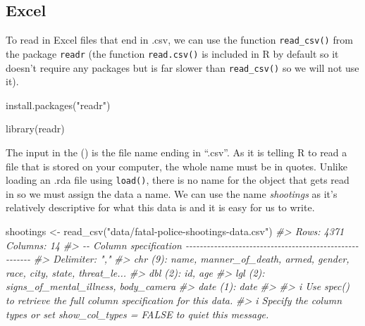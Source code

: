 \documentclass[
]{krantz}
\makeatletter
\newenvironment{Shaded}{\begin{snugshade}}{\end{snugshade}}
\newcommand{\CommentTok}[1]{\textcolor[rgb]{0.37,0.37,0.37}{\textit{#1}}}
\newcommand{\FunctionTok}[1]{\textcolor[rgb]{0,0,0}{#1}}
\newcommand{\NormalTok}[1]{#1}
\newcommand{\OtherTok}[1]{\textcolor[rgb]{0.37,0.37,0.37}{#1}}
\newcommand{\StringTok}[1]{\textcolor[rgb]{0.5,0.5,0.5}{#1}}
\newenvironment{kframe}{%
\medskip{}
\setlength{\fboxsep}{.8em}
 \def\at@end@of@kframe{}%
 \ifinner\ifhmode%
  \def\at@end@of@kframe{\end{minipage}}%
  \begin{minipage}{\columnwidth}%
 \fi\fi%
 \def\FrameCommand##1{\hskip\@totalleftmargin \hskip-\fboxsep
 \colorbox{shadecolor}{##1}\hskip-\fboxsep
     \hskip-\linewidth \hskip-\@totalleftmargin \hskip\columnwidth}%
 \MakeFramed {\advance\hsize-\width
   \@totalleftmargin\z@ \linewidth\hsize
   \@setminipage}}%
 {\par\unskip\endMakeFramed%
 \at@end@of@kframe}
\renewenvironment{Shaded}{\begin{kframe}}{\end{kframe}}
\makeatother
\begin{document}
\hypertarget{excel}{%
\subsection{Excel}\label{excel}}

To read in Excel files that end in .csv, we can use the function \texttt{read\_csv()} from the package \texttt{readr} (the function \texttt{read.csv()} is included in R by default so it doesn't require any packages but is far slower than \texttt{read\_csv()} so we will not use it).

\begin{Shaded}
\begin{Highlighting}[]
\FunctionTok{install.packages}\NormalTok{(}\StringTok{"readr"}\NormalTok{)}
\end{Highlighting}
\end{Shaded}

\begin{Shaded}
\begin{Highlighting}[]
\FunctionTok{library}\NormalTok{(readr)}
\end{Highlighting}
\end{Shaded}

The input in the () is the file name ending in ``.csv''. As it is telling R to read a file that is stored on your computer, the whole name must be in quotes. Unlike loading an .rda file using \texttt{load()}, there is no name for the object that gets read in so we must assign the data a name. We can use the name \emph{shootings} as it's relatively descriptive for what this data is and it is easy for us to write.

\begin{Shaded}
\begin{Highlighting}[]
\NormalTok{shootings }\OtherTok{\textless{}{-}} \FunctionTok{read\_csv}\NormalTok{(}\StringTok{"data/fatal{-}police{-}shootings{-}data.csv"}\NormalTok{)}
\CommentTok{\#\textgreater{} Rows: 4371 Columns: 14}
\CommentTok{\#\textgreater{} {-}{-} Column specification {-}{-}{-}{-}{-}{-}{-}{-}{-}{-}{-}{-}{-}{-}{-}{-}{-}{-}{-}{-}{-}{-}{-}{-}{-}{-}{-}{-}{-}{-}{-}{-}{-}{-}{-}{-}{-}{-}{-}{-}{-}{-}{-}{-}{-}{-}{-}{-}{-}{-}{-}{-}{-}{-}{-}{-}}
\CommentTok{\#\textgreater{} Delimiter: ","}
\CommentTok{\#\textgreater{} chr  (9): name, manner\_of\_death, armed, gender, race, city, state, threat\_le...}
\CommentTok{\#\textgreater{} dbl  (2): id, age}
\CommentTok{\#\textgreater{} lgl  (2): signs\_of\_mental\_illness, body\_camera}
\CommentTok{\#\textgreater{} date (1): date}
\CommentTok{\#\textgreater{} }
\CommentTok{\#\textgreater{} i Use \textasciigrave{}spec()\textasciigrave{} to retrieve the full column specification for this data.}
\CommentTok{\#\textgreater{} i Specify the column types or set \textasciigrave{}show\_col\_types = FALSE\textasciigrave{} to quiet this message.}
\end{Highlighting}
\end{Shaded}
\end{document}
